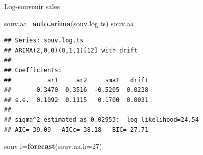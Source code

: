 \documentclass[ignorenonframetext,]{beamer}
\newenvironment{Shaded}{\begin{snugshade}}{\end{snugshade}}
\newcommand{\DataTypeTok}[1]{\textcolor[rgb]{0.13,0.29,0.53}{#1}}
\newcommand{\DecValTok}[1]{\textcolor[rgb]{0.00,0.00,0.81}{#1}}
\newcommand{\KeywordTok}[1]{\textcolor[rgb]{0.13,0.29,0.53}{\textbf{#1}}}
\newcommand{\NormalTok}[1]{#1}
\begin{document}
\begin{frame}[fragile]{Log-souvenir sales}
\protect\hypertarget{log-souvenir-sales}{}

\begin{Shaded}
\begin{Highlighting}[]
\NormalTok{souv.aa=}\KeywordTok{auto.arima}\NormalTok{(souv.log.ts)}
\NormalTok{souv.aa}
\end{Highlighting}
\end{Shaded}

\begin{verbatim}
## Series: souv.log.ts 
## ARIMA(2,0,0)(0,1,1)[12] with drift 
## 
## Coefficients:
##          ar1     ar2     sma1   drift
##       0.3470  0.3516  -0.5205  0.0238
## s.e.  0.1092  0.1115   0.1700  0.0031
## 
## sigma^2 estimated as 0.02953:  log likelihood=24.54
## AIC=-39.09   AICc=-38.18   BIC=-27.71
\end{verbatim}

\begin{Shaded}
\begin{Highlighting}[]
\NormalTok{souv.f=}\KeywordTok{forecast}\NormalTok{(souv.aa,}\DataTypeTok{h=}\DecValTok{27}\NormalTok{)}
\end{Highlighting}
\end{Shaded}

\end{frame}
\end{document}
